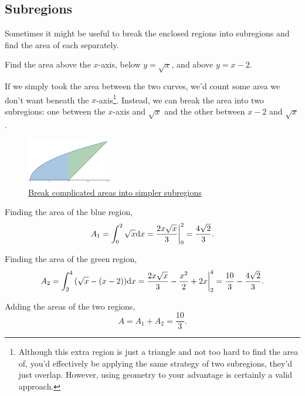\subsection{Subregions}
Sometimes it might be useful to break the enclosed regions into subregions and find the area of each separately.
\begin{example}
	Find the area above the $x$-axis, below $y=\sqrt{x}$, and above $y=x-2$.
\end{example}
\begin{answer}
	If we simply took the area between the two curves, we'd count some area we don't want beneath the $x$-axis\footnote{Although this extra region is just a triangle and not too hard to find the area of, you'd effectively be applying the same strategy of two subregions, they'd just overlap. However, using geometry to your advantage is certainly a valid approach.}.
	Instead, we can break the area into two subregions: one between the $x$-axis and $\sqrt{x}$ and the other between $x-2$ and $\sqrt{x}$.
	\begin{figure}[H]
		\label{subregions}
		\centering
		\includegraphics[width = 0.33\textwidth]{./applications_integrals/two_regions.png}
		\caption{\hyperref{}{}{}{Break complicated areas into simpler subregions}}
	\end{figure}
	
	Finding the area of the blue region,
	\begin{equation*}
		A_1 = \int_{0}^{2}{\sqrt{x}\mathrm{d} x} = \frac{2x\sqrt{x}}{3}\biggr\rvert_0^2 = \frac{4\sqrt{2}}{3}.
	\end{equation*}
	
	Finding the area of the green region,
	\begin{equation*}
		A_2 = \int_{2}^{4}{(\sqrt{x}-(x-2))\mathrm{d} x} = \frac{2x\sqrt{x}}{3} - \frac{x^2}{2} + 2x \biggr\rvert_2^4 = \frac{10}{3} - \frac{4\sqrt{2}}{3}.
	\end{equation*}
	
	Adding the areas of the two regions,
	\begin{equation*}
		A = A_1 + A_2 = \frac{10}{3}.
	\end{equation*}
\end{answer}

